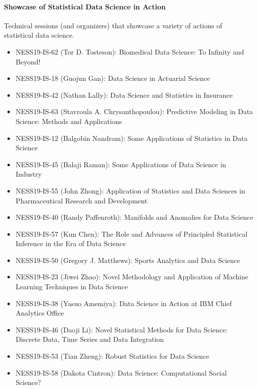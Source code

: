 \documentclass[12pt]{article}
\begin{document}
\paragraph{Showcase of Statistical Data Science in Action}
Technical sessions (and organizers) that showcase a variety of
actions of statistical data science.
\begin{itemize}
\item
  NESS19-IS-62 (Tor D. Tosteson):
  Biomedical Data Science: To Infinity and Beyond!

\item
  NESS19-IS-18 (Guojun Gan):
  Data Science in Actuarial Science

\item
  NESS19-IS-42 (Nathan Lally):
  Data Science and Statistics in Insurance

\item
  NESS19-IS-63 (Stavroula A. Chrysanthopoulou):
  Predictive Modeling in Data Science: Methods and Applications

\item
  NESS19-IS-12 (Balgobin Nandram):
  Some Applications of Statistics in Data Science

\item
  NESS19-IS-45 (Balaji Raman):
  Some Applications of Data Science in Industry

\item
  NESS19-IS-55 (John Zhong):
  Application of Statistics and Data Sciences in Pharmaceutical
  Research and Development

\item
  NESS19-IS-40 (Randy Paffenroth):
  Manifolds and Anomalies for Data Science

\item
  NESS19-IS-57 (Kun Chen):
  The Role and Advances of Principled Statistical Inference in the Era
  of Data Science

\item
  NESS19-IS-50 (Gregory J. Matthews):
  Sports Analytics and Data Science

\item
  NESS19-IS-23 (Jiwei Zhao):
 Novel Methodology and Application of Machine Learning Techniques in
 Data Science

\item
  NESS19-IS-38 (Yasuo Amemiya):
  Data Science in Action at IBM Chief Analytics Office

\item
  NESS19-IS-46 (Daoji Li):
  Novel Statistical Methods for Data Science: Discrete Data, Time
  Series and Data Integration

\item
  NESS19-IS-53 (Tian Zheng):
  Robust Statistics for Data Science

\item
  NESS19-IS-58 (Dakota Cintron):
  Data Science: Computational Social Science?
\end{itemize}
\end{document}
